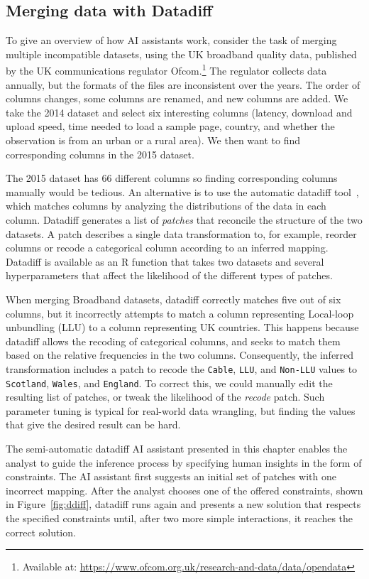 \documentclass[fleqn,11pt]{report}
\theoremstyle{definition}
\begin{document}
\subsection{Merging data with Datadiff}

To give an overview of how AI assistants work, consider the task of merging
multiple incompatible datasets, using the UK broadband quality data, published
by the UK communications regulator Ofcom.\footnote{Available at: \url{https://www.ofcom.org.uk/research-and-data/data/opendata}}
The regulator collects data annually, but the formats of the files are inconsistent over the
years. The order of columns changes, some columns are renamed, and new columns are added. We
take the 2014 dataset and select six interesting columns (latency, download and
upload speed, time needed to load a sample page, country, and whether the observation is from
an urban or a rural area). We then want to find corresponding columns in the 2015 dataset.

The 2015 dataset has 66 different columns so finding corresponding columns manually would be
tedious. An alternative is to use the automatic datadiff tool~\citep{sutton-2018-datadiff}, which
matches columns by analyzing the distributions of the data in each column. Datadiff generates a list of
\emph{patches} that reconcile the structure of the two datasets. A patch describes a single data
transformation to, for example, reorder columns or recode a categorical column according to an
inferred mapping. Datadiff is available as an R function that takes two datasets and several
hyperparameters that affect the likelihood of the different types of patches.

When merging Broadband datasets, datadiff correctly matches five out of six columns, but it
incorrectly attempts to match a column representing Local-loop unbundling (LLU) to a column
representing UK countries. This happens because datadiff allows the recoding of categorical columns,
and seeks to match them based on the relative frequencies in the two columns. Consequently,
the inferred transformation includes a patch to recode the \texttt{Cable}, \texttt{LLU}, and
\texttt{Non-LLU} values to \texttt{Scotland}, \texttt{Wales}, and \texttt{England}. To correct this,
we could manually edit the resulting list of patches, or tweak the likelihood of the
\emph{recode} patch. Such parameter tuning is typical for real-world data wrangling, but finding
the values that give the desired result can be hard.

The semi-automatic datadiff AI assistant presented in this chapter enables the analyst to guide
the inference process by specifying human insights in the form of constraints.
The AI assistant first suggests an initial set of patches with one incorrect mapping. After the
analyst chooses one of the offered constraints, shown in Figure~\ref{fig:ddiff}, datadiff
runs again and presents a new solution that respects the specified constraints
until, after two more simple interactions, it reaches the correct solution.
\end{document}
